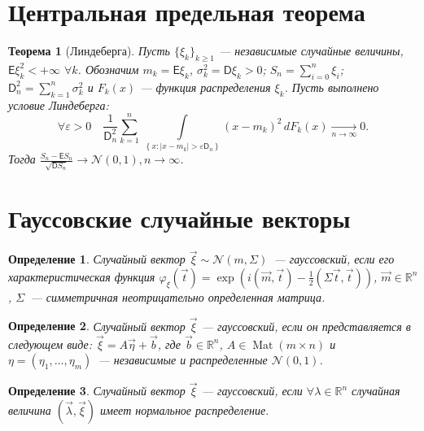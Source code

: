 \documentclass[11pt]{article}
\newtheorem{theorem}{Теорема}[section]
\newtheorem{definition}{Определение}
\DeclareMathOperator{\mat}{Mat}
\begin{document}
    \section[]{Центральная предельная теорема}
        \begin{theorem}[Линдеберга]
            Пусть $\{\xi_k\}_{k \geqslant 1}$ --- независимые случайные величины, $\mathsf{E} \xi_k^2 < + \infty$ $\forall k$. 
            Обозначим $m_k = \mathsf{E} \xi_k$, $\sigma_k^2 = \mathsf{D} \xi_k > 0$; $S_n = \sum_{i=0}^{n} \xi_i$; $\mathsf{D}_n^2 = \sum_{k=1}^{n} \sigma_k^2$ и $F_k(x)$ --- функция распределения $\xi_k$. 
            Пусть выполнено условие Линдеберга:
                $$ \forall \varepsilon > 0\quad \frac{1}{\mathsf{D}_n^2} \sum\limits_{k=1}^{n}\,\int\limits_{\left\{x : |x-m_k| > \varepsilon\mathsf{D}_n \right\}}{(x - m_k)^2 \,dF_k(x)} \xrightarrow[n \rightarrow \infty]{} 0. $$
            Тогда $\frac{S_n - \mathsf{E} S_n}{\sqrt{\mathsf{D} S_n}} \longrightarrow{} \mathcal{N}(0,1), n \rightarrow \infty$.
        \end{theorem}

    \section[]{Гауссовские случайные векторы}
        \begin{definition}
            Случайный вектор $\vec {\xi} \sim \mathcal{N}(m,\Sigma)$~--- гауссовский, если его характеристическая функция $\varphi_{\xi}(\vec{t}) = \exp{(i(\vec{m}, \vec{t}) - \frac{1}{2}(\Sigma \vec{t}, \vec{t} ))}$, $\vec{m} \in \mathbb{R}^n$, $\Sigma$~--- симметричная неотрицательно определенная матрица.
        \end{definition}

        \begin{definition}
            Случайный вектор $\vec {\xi}$ --- гауссовский, если он представляется в следующем виде: $\vec \xi = A \vec \eta + \vec b$, где $\vec b \in \mathbb{R}^n$, $A \in \mat{(m \times n)}$ и $\eta = (\eta_1, \dots, \eta_m)$~--- независимые и распределенные $\mathcal{N}(0,1)$.
        \end{definition}
        
        \begin{definition}
            Случайный вектор $\vec {\xi}$ --- гауссовский, если $\forall\lambda \in \mathbb{R}^n$ случайная величина $(\vec \lambda, \vec {\xi})$ имеет нормальное распределение.
        \end{definition}
        
\end{document}
